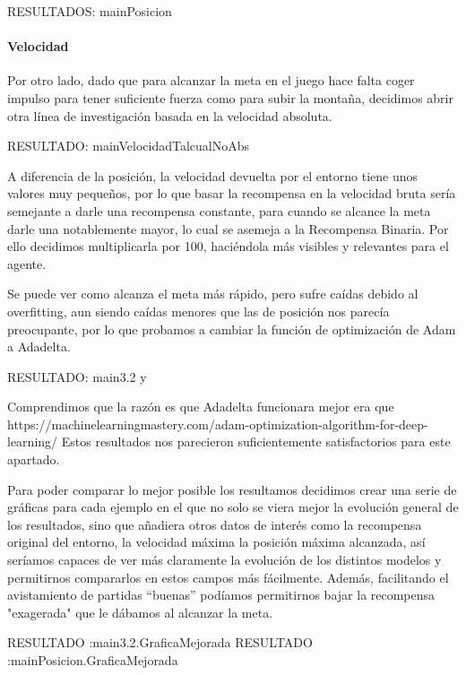 RESULTADOS: mainPosicion

\paragraph{Velocidad}
Por otro lado, dado que para alcanzar la meta en el juego hace falta coger impulso para tener suficiente fuerza como para subir la montaña, decidimos abrir otra línea de investigación basada en la velocidad absoluta.

RESULTADO: mainVelocidadTalcualNoAbs

A diferencia de la posición, la velocidad devuelta por el entorno tiene unos valores muy pequeños, por lo que basar la recompensa en la velocidad bruta sería semejante a darle una recompensa constante, para cuando se alcance la meta darle una notablemente mayor, lo cual se asemeja a la Recompensa Binaria. Por ello decidimos multiplicarla por 100, haciéndola más visibles y relevantes para el agente. 

Se puede ver como alcanza el meta más rápido, pero sufre caídas debido al overfitting, aun siendo caídas menores que las de posición nos parecía preocupante, por lo que probamos a cambiar la función de optimización de Adam a Adadelta.

RESULTADO: main3.2 y  

Comprendimos que la razón es que Adadelta funcionara mejor era que 
https://machinelearningmastery.com/adam-optimization-algorithm-for-deep-learning/
Estos resultados nos parecieron suficientemente satisfactorios para este apartado.

Para poder comparar lo mejor posible los resultamos decidimos crear una serie de gráficas para cada ejemplo en el que no solo se viera mejor la evolución general de los resultados, sino que añadiera otros datos de interés como la recompensa original del entorno, la velocidad máxima la posición máxima alcanzada, así seríamos capaces de ver más claramente la evolución de los distintos modelos y permitirnos compararlos en estos campos más fácilmente.
Además, facilitando el avistamiento de partidas “buenas” podíamos permitirnos bajar la recompensa "exagerada" que le dábamos al alcanzar la meta.

RESULTADO :main3.2.GraficaMejorada
RESULTADO :mainPosicion.GraficaMejorada

